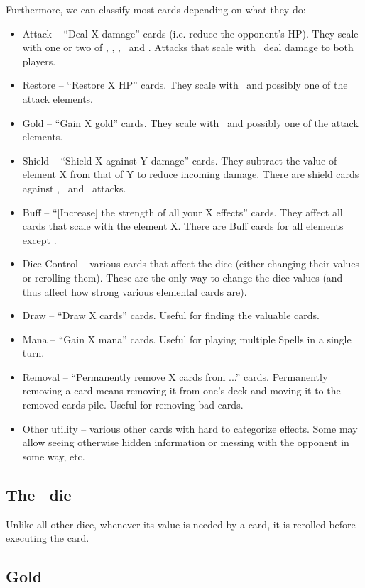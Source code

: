 \documentclass[dvipsnames,parskip,a4paper]{scrartcl}
\newcommand{\iconsize}{3.4mm}
\newcommand{\icondepth}{0.45mm}
\newcommand{\icon}[1]{\raisebox{-\icondepth}{\texttt{[image:  \#1 ]}}}
\newcommand{\fire}{\icon{icons/fire.png}}
\newcommand{\earth}{\icon{icons/earth.png}}
\newcommand{\water}{\icon{icons/water.png}}
\newcommand{\nature}{\icon{icons/nature.png}}
\newcommand{\magic}{\icon{icons/magic.png}}
\newcommand{\gold}{\icon{icons/gold.png}}
\newcommand{\chance}{\icon{icons/chance.png}}
\begin{document}
Furthermore, we can classify most cards depending on what they do:

\begin{itemize}
\item Attack -- ``Deal X damage'' cards (i.e. reduce the opponent's HP). They scale with one or two of \fire, \earth, \water, \chance \ and \magic. Attacks that scale with \water \ deal damage to both players.
\item Restore -- ``Restore X HP'' cards. They scale with \nature \ and possibly one of the attack elements.
\item Gold -- ``Gain X gold'' cards. They scale with \gold \ and possibly one of the attack elements.
\item Shield -- ``Shield X against Y damage'' cards. They subtract the value of element X from that of Y to reduce incoming damage. There are shield cards against \fire, \earth \ and \water \ attacks.
\item Buff -- ``[Increase] the strength of all your X effects'' cards. They affect all cards that scale with the element X. There are Buff cards for all elements except \chance.
\item Dice Control -- various cards that affect the dice (either changing their values or rerolling them). These are the only way to change the dice values (and thus affect how strong various elemental cards are).
\item Draw -- ``Draw X cards'' cards. Useful for finding the valuable cards.
\item Mana -- ``Gain X mana'' cards. Useful for playing multiple Spells in a single turn.
\item Removal -- ``Permanently remove X cards from ...'' cards. Permanently removing a card means removing it from one's deck and moving it to the removed cards pile. Useful for removing bad cards.
\item Other utility -- various other cards with hard to categorize effects. Some may allow seeing otherwise hidden information or messing with the opponent in some way, etc.
\end{itemize}

\subsection*{The \chance \ die}

Unlike all other dice, whenever its value is needed by a card, it is rerolled before executing the card.

\subsection*{Gold}
\end{document}
